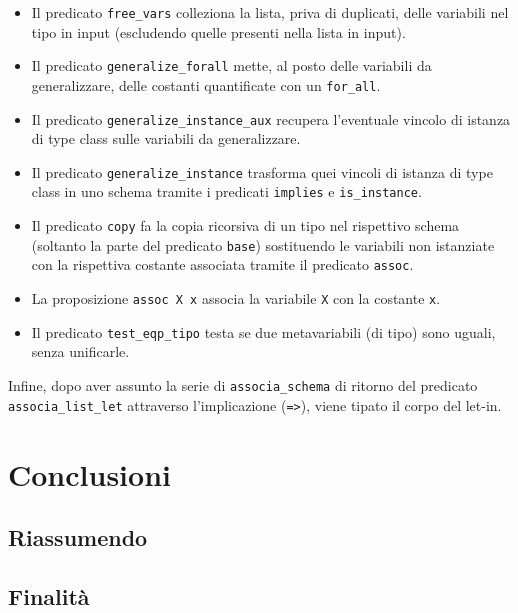 \documentclass[12pt,a4paper,openright,twoside]{report}
\begin{document}
\begin{itemize}
 \item Il predicato \verb"free_vars" colleziona la lista, priva di duplicati, delle variabili nel tipo in input (escludendo quelle presenti nella lista in input).
 \item Il predicato \verb"generalize_forall" mette, al posto delle variabili da generalizzare, delle costanti quantificate con un \verb"for_all".
 \item Il predicato \verb"generalize_instance_aux" recupera l'eventuale vincolo di istanza di type class sulle variabili da generalizzare.
 \item Il predicato \verb"generalize_instance" trasforma quei vincoli di istanza di type class in uno schema tramite i predicati \verb"implies" e \verb"is_instance".
 \item Il predicato \verb"copy" fa la copia ricorsiva di un tipo nel rispettivo schema (soltanto la parte del predicato \verb"base") sostituendo le variabili non istanziate con la rispettiva costante associata tramite il predicato \verb"assoc".
 \item La proposizione \verb"assoc X x" associa la variabile \verb"X" con la costante \verb"x".
 \item Il predicato \verb"test_eqp_tipo" testa se due metavariabili (di tipo) sono uguali, senza unificarle.
\end{itemize}
Infine, dopo aver assunto la serie di \verb"associa_schema" di ritorno del predicato \verb"associa_list_let" attraverso l'implicazione (\verb"=>"), viene tipato il corpo del let-in.

\clearpage{\pagestyle{empty}\cleardoublepage}		%


\chapter{Conclusioni}		%



\section{Riassumendo}

\section{Finalità}
\end{document}

